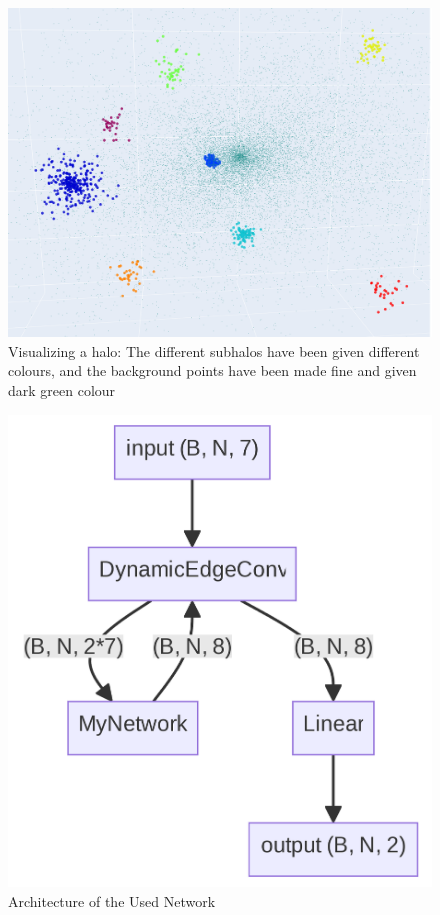     \begin{figure}[h]
        \centering
        \includegraphics[width=0.9\linewidth]{images/g2.png}
        \caption{Visualizing a halo: The different subhalos have been given different colours, and the background points have been made fine and given dark green colour}
        \label{graph:eg_halo}
    \end{figure}

    \begin{figure}
        \centering
        \includegraphics[width=0.9\linewidth]{images/network.png}
        \caption{Architecture of the Used Network}
        \label{fig:network}
    \end{figure}

